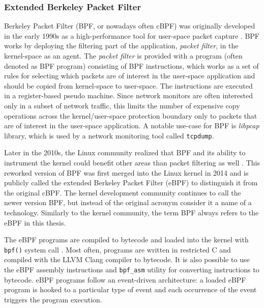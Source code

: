 \documentclass[english, 12pt, a4paper, sci, utf8, a-2b, online]{aaltothesis}
\begin{document}
\subsubsection{Extended Berkeley Packet Filter}

Berkeley Packet Filter (BPF, or nowadays often cBPF) was originally developed in the early 1990s as a high-performance tool for user-space packet capture \cite{mccanne1993bsd}.
BPF works by deploying the filtering part of the application, \emph{packet filter}, in the kernel-space as an agent.
The \emph{packet filter} is provided with a program (often denoted as BPF program) consisting of BPF instructions, which works as a set of rules for selecting which packets are of interest in the user-space application and should be copied from kernel-space to user-space.
The instructions are executed in a register-based pseudo machine.
Since network monitors are often interested only in a subset of network traffic, this limits the number of expensive copy operations across the kernel/user-space protection boundary only to packets that are of interest in the user-space application.
A notable use-case for BPF is \emph{libpcap} library, which is used by a network monitoring tool called \lstinline{tcpdump}.

Later in the 2010s, the Linux community realized that BPF and its ability to instrument the kernel could benefit other areas than packet filtering as well \cite{vieira2020fast}.
This reworked version of BPF was first merged into the Linux kernel in 2014 and is publicly called the extended Berkeley Packet Filter (eBPF) to distinguish it from the original cBPF.
The kernel development community continues to call the newer version BPF, but instead of the original acronym consider it a name of a technology.
Similarly to the kernel community, the term BPF always refers to the eBPF in this thesis.

The eBPF programs are compiled to bytecode and loaded into the kernel with \lstinline{bpf()} system call \cite{miano2021framework}.
Most often, programs are written in restricted C and compiled with the LLVM Clang compiler to bytecode.
It is also possible to use the eBPF assembly instructions and \lstinline{bpf_asm} utility for converting instructions to bytecode.
eBPF programs follow an event-driven architecture: a loaded eBPF program is hooked to a particular type of event and each occurrence of the event triggers the program execution.
\end{document}
